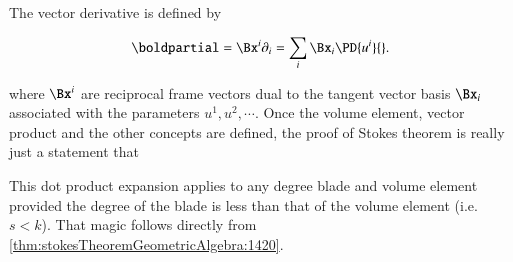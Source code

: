 %
%

The vector derivative is defined by

\begin{equation}\label{eqn:stokesTheoremTheStatement:1400}
\boldpartial = \Bx^i \partial_i = \sum_i \Bx_i \PD{u^i}{}.
\end{equation}

where \( \Bx^i \) are reciprocal frame vectors dual to the tangent vector basis \( \Bx_i \) associated with the parameters \( u^1, u^2, \cdots \).
Once the volume element, vector product and the other concepts are defined, the proof of
Stokes theorem is really just a statement that


This dot product expansion applies to any degree blade and volume element provided the degree of the blade is less than that of the volume element (i.e. \(s < k\)).  That magic follows directly from \cref{thm:stokesTheoremGeometricAlgebra:1420}.
